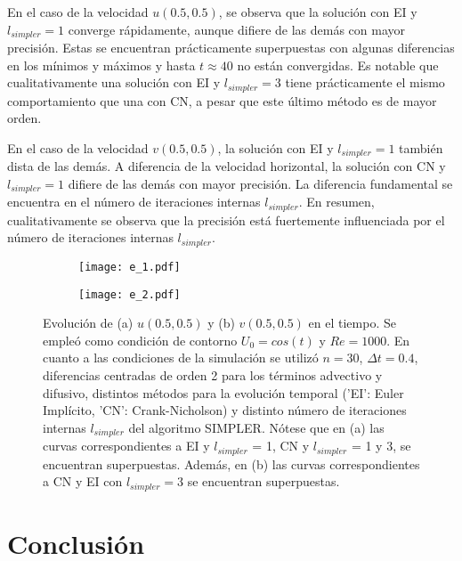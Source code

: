 \documentclass[aps,prb,twocolumn,superscriptaddress,floatfix,longbibliography,10pt]{revtex4-2}
\newcounter{para}
\begin{document}
En el caso de la velocidad $u(0.5,0.5)$, se observa que la solución con EI y $l_{simpler} = 1$ converge rápidamente, aunque difiere de las demás con mayor precisión. Estas se encuentran prácticamente superpuestas con algunas diferencias en los mínimos y máximos y hasta $t \approx 40$ no están convergidas. Es notable que cualitativamente una solución con EI y $l_{simpler} = 3$ tiene prácticamente el mismo comportamiento que una con CN, a pesar que este último método es de mayor orden.
  
En el caso de la velocidad $v(0.5,0.5)$, la solución con EI y $l_{simpler} = 1$ también dista de las demás. A diferencia de la velocidad horizontal, la solución con CN y $l_{simpler} = 1$ difiere de las demás con mayor precisión. La diferencia fundamental se encuentra en el número de iteraciones internas $l_{simpler}$. En resumen, cualitativamente se observa que la precisión está fuertemente influenciada por el número de iteraciones internas $l_{simpler}$.


\begin{figure}
  \centering
  \begin{subfigure}[b]{0.45\textwidth}
      \centering
      \texttt{[image: e\_1.pdf]}
      \caption{}
      \label{fig:e_1}
  \end{subfigure}
  \hfill
  \begin{subfigure}[b]{0.45\textwidth}
      \centering
      \texttt{[image: e\_2.pdf]}
      \caption{}
      \label{fig:e_2}
  \end{subfigure}
     \caption{Evolución de (a) $u(0.5,0.5)$ y (b) $v(0.5,0.5)$ en el tiempo. Se empleó como condición de contorno $U_0 = cos(t)$ y $Re = 1000$. En cuanto a las condiciones de la simulación se utilizó $n = 30$, $\Delta t = 0.4$, diferencias centradas de orden 2 para los términos advectivo y difusivo, distintos métodos para la evolución temporal ('EI': Euler Implícito, 'CN': Crank-Nicholson) y distinto número de iteraciones internas $l_{simpler}$ del algoritmo SIMPLER. Nótese que en (a) las curvas correspondientes a EI y $l_{simpler}$ = 1, CN y $l_{simpler}$ = 1 y 3, se encuentran superpuestas. Además, en (b) las curvas correspondientes a CN y EI con $l_{simpler} = 3$ se encuentran superpuestas.}
     \label{fig:e}
\end{figure}









\section{Conclusión}
\end{document}
